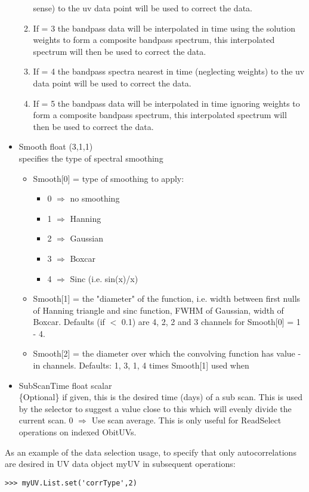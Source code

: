 \documentclass[11pt]{report}
\begin{document}
\begin{itemize}
\begin{enumerate}
sense) to the uv data point will be used to correct the data. 
\item If = 3 the bandpass data will be interpolated in time using the
solution weights to form a composite bandpass spectrum, this
interpolated spectrum will then be used to correct the data.
\item If = 4 the bandpass spectra nearest in time (neglecting weights)
to the uv data point will be used to correct the data.
\item If = 5 the bandpass data will be interpolated in time ignoring
weights to form a composite bandpass spectrum, this interpolated
spectrum will then be used to correct the data. 
\end{enumerate}
\item  Smooth  float (3,1,1) \\
specifies the type of spectral smoothing
\begin{itemize}
 \item  Smooth[0] = type of smoothing to apply:
\begin{itemize}
\item 0 $\Rightarrow$ no smoothing
\item 1 $\Rightarrow$ Hanning
\item 2 $\Rightarrow$ Gaussian
\item 3 $\Rightarrow$ Boxcar
\item 4 $\Rightarrow$ Sinc (i.e. sin(x)/x)
\end{itemize}
\item Smooth[1] = the "diameter" of the function, i.e. width between
first nulls of Hanning triangle  and sinc function, FWHM of Gaussian,
width of Boxcar. Defaults (if $<$ 0.1) are 4, 2, 2 and 3 channels for
Smooth[0] = 1 - 4. 
\item Smooth[2] = the diameter over which the convolving function has
value - in channels. Defaults: 1, 3, 1, 4 times Smooth[1] used when
\end{itemize}
\item SubScanTime float scalar \\
\{Optional\} if given, this is the desired time (days) of a sub scan.  
This is used by the selector to suggest a value close to this which will
evenly divide the current scan.  0 $\Rightarrow$ Use scan average.
This is only useful for ReadSelect operations on indexed ObitUVs.
\end{itemize}

As an example of the data selection usage, to specify that only
autocorrelations are desired in UV data object myUV in subsequent
operations: 
\begin{verbatim}
>>> myUV.List.set('corrType',2)
\end{verbatim}
\end{document}
